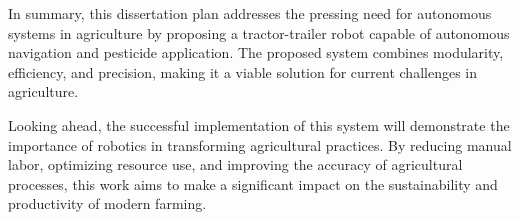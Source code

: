 In summary, this dissertation plan addresses the pressing need for autonomous 
systems in agriculture by proposing a tractor-trailer robot capable of autonomous 
navigation and pesticide application. The proposed system combines modularity, 
efficiency, and precision, making it a viable solution for current challenges in 
agriculture.

Looking ahead, the successful implementation of this system will demonstrate 
the importance of robotics in transforming agricultural practices. By reducing 
manual labor, optimizing resource use, and improving the accuracy of agricultural 
processes, this work aims to make a significant impact on the sustainability and 
productivity of modern farming.

